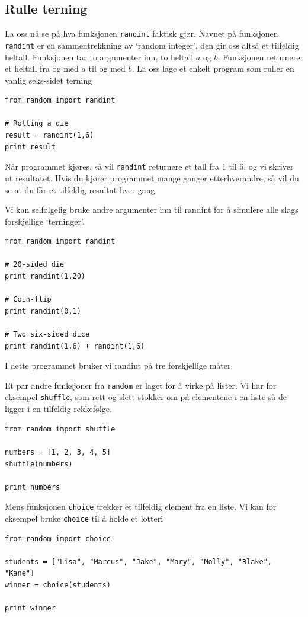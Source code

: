 \documentclass[a4paper, 11pt, notitlepage]{article}
\begin{document}
\subsection*{Rulle terning}

La oss nå se på hva funksjonen \verb+randint+ faktisk gjør. Navnet på funksjonen \verb+randint+ er en sammentrekkning av `random integer', den gir oss altså et tilfeldig heltall. Funksjonen tar to argumenter inn, to heltall $a$ og $b$. Funksjonen returnerer et heltall fra og med $a$ til og med $b$. La oss lage et enkelt program som ruller en vanlig seks-sidet terning
\begin{lstlisting}
from random import randint

# Rolling a die
result = randint(1,6)
print result
\end{lstlisting}
Når programmet kjøres, så vil \verb+randint+ returnere et tall fra 1 til 6, og vi skriver ut resultatet. Hvis du kjører programmet mange ganger etterhverandre, så vil du se at du får et tilfeldig resultat hver gang.

Vi kan selfølgelig bruke andre argumenter inn til randint for å simulere alle slags forskjellige `terninger'.
\begin{lstlisting}
from random import randint

# 20-sided die
print randint(1,20)

# Coin-flip
print randint(0,1)

# Two six-sided dice
print randint(1,6) + randint(1,6)
\end{lstlisting}
I dette programmet bruker vi randint på tre forskjellige måter. 

Et par andre funksjoner fra \verb+random+ er laget for å virke på lister. Vi har for eksempel \verb+shuffle+, som rett og slett stokker om på elementene i en liste så de ligger i en tilfeldig rekkefølge.
\begin{lstlisting}
from random import shuffle

numbers = [1, 2, 3, 4, 5]
shuffle(numbers)

print numbers
\end{lstlisting}
Mens funksjonen \verb+choice+ trekker et tilfeldig element fra en liste. Vi kan for eksempel bruke \verb+choice+ til å holde et lotteri
\begin{lstlisting}
from random import choice

students = ["Lisa", "Marcus", "Jake", "Mary", "Molly", "Blake", "Kane"]
winner = choice(students)

print winner
\end{lstlisting}
\end{document}
